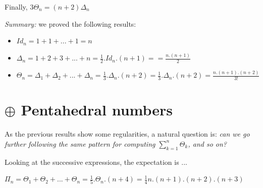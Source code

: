 Finally, $3 \Theta_n = (n+2) \Delta_n$
\medskip

\noindent \textit{Summary:} we proved the following results:
\begin{itemize}
\item $Id_n = 1+1+ ... +1 = n$
\item $\Delta_n = 1+2+3+ ... +n = \frac{1}{2}.Id_n.(n+1) = = \frac{n.(n+1)}{2}$
\item $\Theta_n = \Delta_1 + \Delta_2 + ... + \Delta_n = \frac{1}{3} .\Delta_n.(n+2) = \frac{1}{3}.\Delta_n.(n+2) = \frac{n.(n+1).(n+2)}{3!}$
\end{itemize}


\section{$\oplus$ Pentahedral numbers}

As the previous results show some regularities, a natural question is: \textit{can we go further following the same pattern for computing 
$ \sum_{k=1}^{n} \Theta_k$, and so on?}

Looking at the successive expressions, the expectation is ...

$\Pi_n = \Theta_1 + \Theta_2 + ... + \Theta_n = \frac{1}{5}.\Theta_n.(n+4) = \frac{1}{4} n.(n+1).(n+2).(n+3)$

